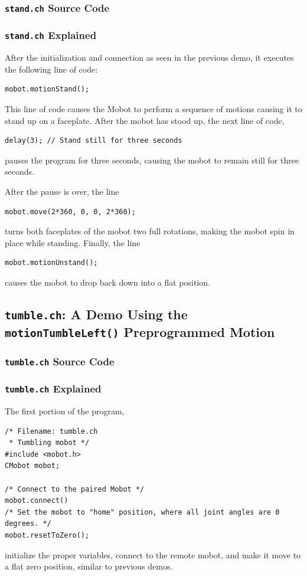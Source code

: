 \documentclass{article}
\begin{document}
\subsubsection{\texttt{stand.ch} Source Code}

\subsubsection{\texttt{stand.ch} Explained}
After the initialization and 
connection as seen in the previous demo, it executes the following line of
code:
\begin{verbatim}
mobot.motionStand();
\end{verbatim}
This line of code causes the Mobot to perform a sequence of motions causing it to
stand up on a faceplate. After the mobot has stood up, the next line of code,
\begin{verbatim}
delay(3); // Stand still for three seconds
\end{verbatim}
pauses the program for three seconds, causing the mobot to remain still for three
seconds. 

After the pause is over, the line
\begin{verbatim}
mobot.move(2*360, 0, 0, 2*360);
\end{verbatim}
turns both faceplates of the mobot two full rotations, making the mobot spin in place
while standing. Finally, the line
\begin{verbatim}
mobot.motionUnstand();
\end{verbatim}
causes the mobot to drop back down into a flat position.

\subsection{\texttt{tumble.ch}: A Demo Using the \texttt{motionTumbleLeft()} Preprogrammed
Motion}
\subsubsection{\texttt{tumble.ch} Source Code}

\subsubsection{\texttt{tumble.ch} Explained}
The first portion of the program,
\begin{verbatim}
/* Filename: tumble.ch 
 * Tumbling mobot */
#include <mobot.h>
CMobot mobot;

/* Connect to the paired Mobot */
mobot.connect()
/* Set the mobot to "home" position, where all joint angles are 0 degrees. */
mobot.resetToZero();
\end{verbatim}
initialize the proper variables, connect to the remote mobot, and make it move
to a flat zero position, similar to previous demos.
\end{document}
